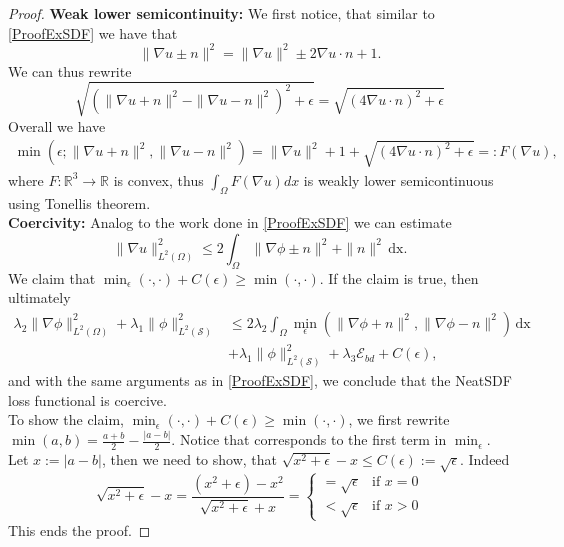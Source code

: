 \documentclass[12pt,openany]{book}
\newcommand{\R}{\mathbb{R}}
\def\S{\mathcal{S}}
\theoremstyle{plainnormal}
\theoremstyle{remark}
\begin{document}
\begin{proof}
\textbf{Weak lower semicontinuity:} We first notice, that similar to \cref{ProofExSDF} we have that $$\|\nabla u \pm n\|^2 = \|\nabla u\|^2 \pm 2 \nabla u \cdot n + 1.$$
    We can thus rewrite $$\sqrt{(\|\nabla u + n\|^2 - \|\nabla u - n\|^2)^2 + \epsilon} = \sqrt{(4 \nabla u\cdot n)^2 + \epsilon}$$
    Overall we have \begin{align*}
        \min (\epsilon; \|\nabla u+ n\|^2,\|\nabla u - n\|^2) = \|\nabla u\|^2 + 1 + \sqrt{(4 \nabla u\cdot n)^2 + \epsilon}=: F(\nabla u), 
    \end{align*}
    where $F :\R^3 \rightarrow\R
    $ is convex, thus $\int_\Omega F(\nabla u) dx$ is weakly lower semicontinuous using Tonellis theorem.\\
    \textbf{Coercivity:} Analog to the work done in \cref{ProofExSDF} we can estimate $$\|\nabla u\|^2_{L^2(\Omega)} \leq 2 \int_\Omega \|\nabla \phi \pm n\|^2 + \|n\|^2\,\mathrm{dx}.$$
    We claim that $\min_\epsilon(\cdot, \cdot) + C(\epsilon) \geq \min(\cdot, \cdot)$. If the claim is true, then ultimately 
    \begin{align*}
    \lambda_2\|\nabla \phi\| ^2_{L^2(\Omega)} + \lambda_1 \|\phi\| ^2_{L^2(\S)}
 &\leq 2 \lambda_2\int_\Omega\min_\epsilon(\|\nabla \phi + n\|^2, \|\nabla \phi - n\|^2) \,\mathrm{dx} \\ 
 &+ \lambda_1 \|\phi\| ^2_{L^2(\S)} + \lambda_3 \mathcal{E}_{bd} + C(\epsilon),
\end{align*} 
and with the same arguments as in \cref{ProofExSDF}, we conclude that the NeatSDF loss functional is coercive.\\
To show the claim, $\min_\epsilon(\cdot, \cdot) + C(\epsilon) \geq \min(\cdot, \cdot)$, we first rewrite $\min(a,b) = \frac{a+b}{2} - \frac{|a-b|}{2}$. Notice that corresponds to the first term in $\min_\epsilon$. Let $x := |a-b|$, then we need to show, that $\sqrt{x^2 + \epsilon } -x \leq C(\epsilon) := \sqrt{\epsilon}$.
Indeed $$\sqrt{x^2 + \epsilon } -x = \frac{(x^2+\epsilon) - x^2}{\sqrt{x^2+\epsilon} + x} = 
\begin{cases}
= \sqrt{\epsilon} & \text{if } x = 0 \\
< \sqrt{\epsilon} & \text{if } x > 0
\end{cases}$$
This ends the proof.
\end{proof}
\clearpage
\end{document}
